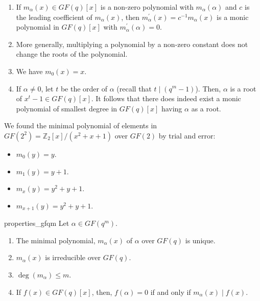 \begin{Remark}{}{}
    \begin{enumerate}[label=(\arabic*)]
        \item If $ m_\alpha(x)\in GF(q)[x] $ is a non-zero polynomial with $ m_\alpha(\alpha) $
              and $ c $ is the leading coefficient of $ m_\alpha(x) $, then
              $ m_\alpha^\prime(x)=c^{-1}m_\alpha(x) $ is a monic polynomial in $ GF(q)[x] $
              with $ m_\alpha^\prime(\alpha)=0 $.
        \item More generally, multiplying a polynomial by a non-zero constant does not change
              the roots of the polynomial.
        \item We have $ m_0(x)=x $.
        \item If $ \alpha\neq 0 $, let $ t $ be the order of $ \alpha $
              (recall that $ t\mid (q^m-1) $). Then, $ \alpha $ is a root of $ x^t-1\in GF(q)[x] $.
              It follows that there does indeed exist a monic polynomial of smallest degree in $ GF(q)[x] $
              having $ \alpha $ as a root.
    \end{enumerate}
\end{Remark}

\begin{Example}{}{}
    We found the minimal polynomial of elements in $ GF(2^2)=\mathbb{Z}_2[x]/(x^2+x+1) $
    over $ GF(2) $ by trial and error:
    \begin{itemize}
        \item $ m_0(y)=y $.
        \item $ m_1(y)=y+1 $.
        \item $ m_x(y)=y^2+y+1 $.
        \item $ m_{x+1}(y)=y^2+y+1 $.
    \end{itemize}
\end{Example}

\begin{Theorem}{}{properties_gfqm}
    Let $ \alpha\in GF(q^m) $.
    \begin{enumerate}[(1)]
        \item The minimal polynomial, $ m_\alpha(x) $ of $ \alpha $
              over $ GF(q) $ is unique.
        \item $ m_\alpha(x) $ is irreducible over $ GF(q) $.
        \item $ \deg(m_\alpha)\leqslant m $.
        \item If $ f(x)\in GF(q)[x] $, then, $ f(\alpha)=0 $ if and only
              if $ m_\alpha(x)\mid f(x) $.
    \end{enumerate}
\end{Theorem}

